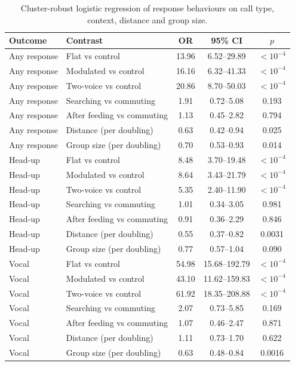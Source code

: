 \begin{table}[!ht]
\centering
\caption{Cluster-robust logistic regression of response behaviours on call type, context, distance and group size.}
\label{tab:p3or}
\footnotesize
\begin{tabular}{llccc}
\toprule
Outcome & Contrast & OR & 95\% CI & $p$ \\
\midrule
Any response & Flat vs control & 13.96 & 6.52--29.89 & $<10^{-4}$ \\
Any response & Modulated vs control & 16.16 & 6.32--41.33 & $<10^{-4}$ \\
Any response & Two-voice vs control & 20.86 & 8.70--50.03 & $<10^{-4}$ \\
Any response & Searching vs commuting & 1.91 & 0.72--5.08 & 0.193 \\
Any response & After feeding vs commuting & 1.13 & 0.45--2.82 & 0.794 \\
Any response & Distance (per doubling) & 0.63 & 0.42--0.94 & 0.025 \\
Any response & Group size (per doubling) & 0.70 & 0.53--0.93 & 0.014 \\
Head-up & Flat vs control & 8.48 & 3.70--19.48 & $<10^{-4}$ \\
Head-up & Modulated vs control & 8.64 & 3.43--21.79 & $<10^{-4}$ \\
Head-up & Two-voice vs control & 5.35 & 2.40--11.90 & $<10^{-4}$ \\
Head-up & Searching vs commuting & 1.01 & 0.34--3.05 & 0.981 \\
Head-up & After feeding vs commuting & 0.91 & 0.36--2.29 & 0.846 \\
Head-up & Distance (per doubling) & 0.55 & 0.37--0.82 & 0.0031 \\
Head-up & Group size (per doubling) & 0.77 & 0.57--1.04 & 0.090 \\
Vocal & Flat vs control & 54.98 & 15.68--192.79 & $<10^{-4}$ \\
Vocal & Modulated vs control & 43.10 & 11.62--159.83 & $<10^{-4}$ \\
Vocal & Two-voice vs control & 61.92 & 18.35--208.88 & $<10^{-4}$ \\
Vocal & Searching vs commuting & 2.07 & 0.73--5.85 & 0.169 \\
Vocal & After feeding vs commuting & 1.07 & 0.46--2.47 & 0.871 \\
Vocal & Distance (per doubling) & 1.11 & 0.73--1.70 & 0.622 \\
Vocal & Group size (per doubling) & 0.63 & 0.48--0.84 & 0.0016 \\

\end{tabular}
\end{table}
